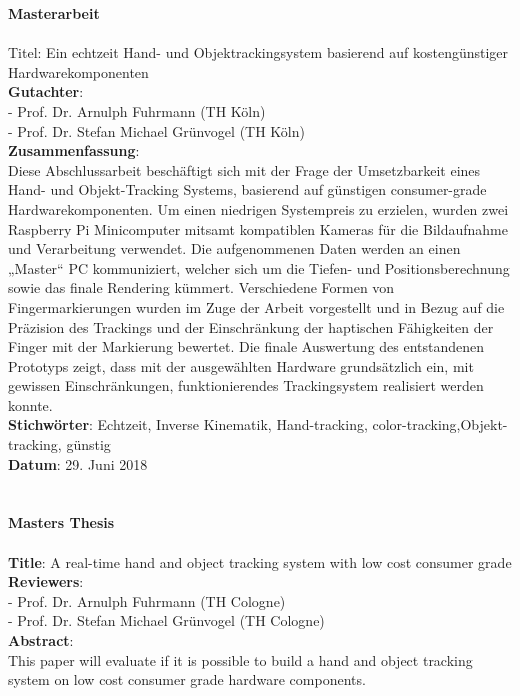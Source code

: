 \begin{titlepage}
\begin{figure}[!ht]
\begin{flushright}
\end{flushright}
\end{figure}
\newpage
\setcounter{page}{1}
\LARGE\textbf{Masterarbeit}\\\\
\small
Titel: Ein echtzeit Hand- und Objektrackingsystem basierend auf kostengünstiger Hardwarekomponenten\\
\textbf{Gutachter}:\\
	- Prof. Dr. Arnulph Fuhrmann (TH Köln)\\
	- Prof. Dr. Stefan Michael Grünvogel (TH Köln)\\
\textbf{Zusammenfassung}:\\ 
Diese Abschlussarbeit beschäftigt sich mit der Frage der Umsetzbarkeit eines Hand- und Objekt-Tracking Systems, basierend auf günstigen consumer-grade Hardwarekomponenten. Um einen niedrigen Systempreis zu erzielen, wurden zwei Raspberry Pi Minicomputer mitsamt kompatiblen Kameras für die Bildaufnahme und Verarbeitung verwendet. Die aufgenommenen Daten werden an einen „Master“ PC kommuniziert, welcher sich um die Tiefen- und Positionsberechnung sowie das finale Rendering kümmert. Verschiedene Formen von Fingermarkierungen wurden im Zuge der Arbeit vorgestellt und in Bezug auf die Präzision des Trackings und der Einschränkung der haptischen Fähigkeiten der Finger mit der Markierung bewertet. Die finale Auswertung des entstandenen Prototyps zeigt, dass mit der ausgewählten Hardware grundsätzlich ein, mit gewissen Einschränkungen, funktionierendes Trackingsystem realisiert werden konnte.\\
\textbf{Stichwörter}: Echtzeit, Inverse Kinematik, Hand-tracking, color-tracking,Objekt-tracking, günstig\\
\textbf{Datum}: 29. Juni 2018\\\\\\
\LARGE \textbf{Masters Thesis}\\\\
\small
\textbf{Title}: A real-time hand and object tracking system with low cost consumer grade\\
\textbf{Reviewers}:\\
	- Prof. Dr. Arnulph Fuhrmann (TH Cologne)\\
	- Prof. Dr. Stefan Michael Grünvogel (TH Cologne)\\
\textbf{Abstract}: \\This paper will evaluate if it is possible to build a hand and object tracking system on low cost consumer grade hardware components.

\end{titlepage}
